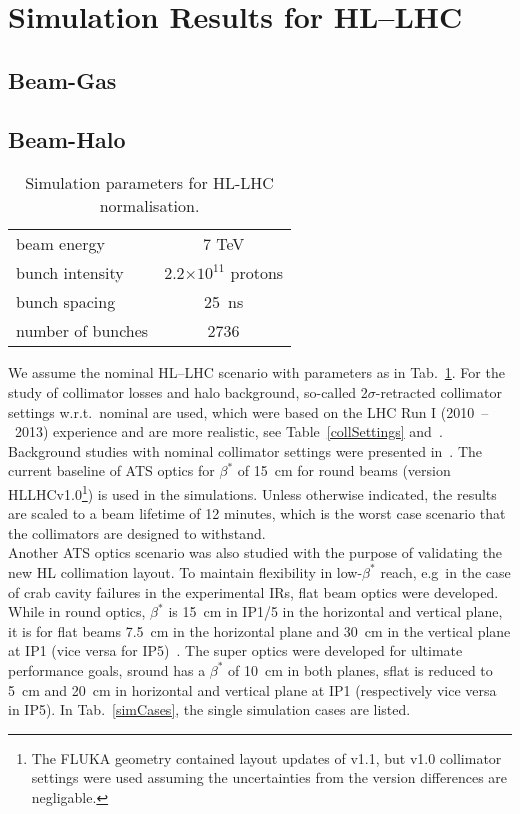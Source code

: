 \section{Simulation Results for HL--LHC}

\subsection{Beam-Gas}
\subsection{Beam-Halo }
\begin{table}%
   \centering
   \caption{Simulation parameters for HL-LHC normalisation.}
   \begin{tabular}{l|c}
       \hline
       beam energy & 7 TeV \\
       bunch intensity & 2.2$\times 10^{11}$ protons\\
       bunch spacing & 25~ns \\
       number of bunches & 2736 \\
       \hline
   \end{tabular}
   \label{hlscenario}
\end{table}

We assume the nominal HL--LHC scenario with parameters as in Tab.~\ref{hlscenario}. For the study of collimator losses and halo background, so-called 2$\sigma$-retracted collimator settings w.r.t.~nominal are used, which were based on the LHC Run I (2010~--~2013) experience and are more realistic, see Table~\ref{collSettings} and~\cite{collSettRef}. Background studies with nominal collimator settings were presented in~\cite{lastyear}. The current baseline of ATS optics for $\beta^{*}$ of 15~cm for round beams (version HLLHCv1.0\footnote{The FLUKA geometry contained layout updates of v1.1, but v1.0 collimator settings were used assuming the uncertainties from the version differences are negligable.}) is used in the simulations.  Unless otherwise indicated, the results are scaled to a beam lifetime of 12 minutes, which is the worst case scenario that the collimators are 
designed to withstand.\\
Another ATS optics scenario was also studied with the purpose of validating the new HL collimation layout. To maintain flexibility in low-$\beta^*$ reach, e.g~in the case of crab cavity failures in the experimental IRs, flat beam optics were developed. While in round optics, $\beta^*$ is 15~cm in IP1/5 in the horizontal and vertical plane, it is for flat beams 7.5~cm in the horizontal plane and 30~cm in the vertical plane at IP1 (vice versa for IP5)~\cite{opticsWebRef}. The super optics were developed for ultimate performance goals, sround has a $\beta^*$ of 10~cm in both planes, sflat is reduced to 5~cm and 20~cm in horizontal and vertical plane at IP1 (respectively vice versa in IP5). In Tab.~\ref{simCases}, the single simulation cases are listed.


